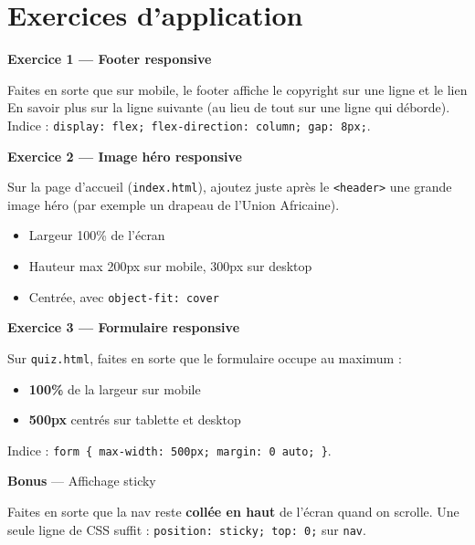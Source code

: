 \documentclass[11pt,a4paper]{article}
\begin{document}
\newpage

\section{Exercices d'application}

\begin{objectifbox}

\textbf{Exercice 1 --- Footer responsive}

Faites en sorte que sur mobile, le footer affiche le copyright sur une
ligne et le lien \og{}En savoir plus\fg{} sur la ligne suivante (au lieu
de tout sur une ligne qui déborde). Indice : \texttt{display: flex;
flex-direction: column; gap: 8px;}.

\medskip

\textbf{Exercice 2 --- Image héro responsive}

Sur la page d'accueil (\texttt{index.html}), ajoutez juste après le
\texttt{<header>} une grande image \og{}héro\fg{} (par exemple un drapeau
de l'Union Africaine).

\begin{itemize}[nosep]
    \item Largeur 100\% de l'écran
    \item Hauteur max 200px sur mobile, 300px sur desktop
    \item Centrée, avec \texttt{object-fit: cover}
\end{itemize}

\medskip

\textbf{Exercice 3 --- Formulaire responsive}

Sur \texttt{quiz.html}, faites en sorte que le formulaire occupe au
maximum :
\begin{itemize}[nosep]
    \item \textbf{100\%} de la largeur sur mobile
    \item \textbf{500px} centrés sur tablette et desktop
\end{itemize}

Indice : \texttt{form \{ max-width: 500px; margin: 0 auto; \}}.

\medskip

\textbf{Bonus} --- Affichage \og{}sticky\fg{}

Faites en sorte que la nav reste \textbf{collée en haut} de l'écran quand
on scrolle. Une seule ligne de CSS suffit : \texttt{position: sticky;
top: 0;} sur \texttt{nav}.
\end{objectifbox}
\end{document}
